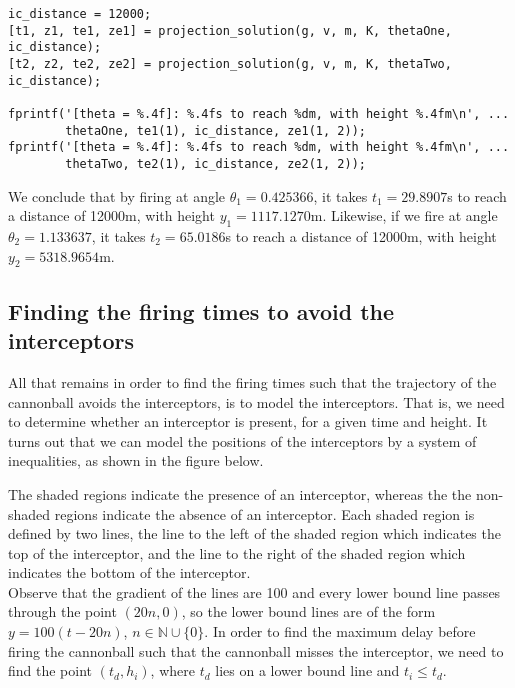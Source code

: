 \begin{lstlisting}
ic_distance = 12000;
[t1, z1, te1, ze1] = projection_solution(g, v, m, K, thetaOne, ic_distance);
[t2, z2, te2, ze2] = projection_solution(g, v, m, K, thetaTwo, ic_distance);

fprintf('[theta = %.4f]: %.4fs to reach %dm, with height %.4fm\n', ...
        thetaOne, te1(1), ic_distance, ze1(1, 2));
fprintf('[theta = %.4f]: %.4fs to reach %dm, with height %.4fm\n', ...
        thetaTwo, te2(1), ic_distance, ze2(1, 2));
\end{lstlisting}

\noindent
We conclude that by firing at angle $\theta_1 = 0.425366$, it takes $t_1 = 29.8907$s to reach a distance of 12000m, with height $y_1 = 1117.1270$m. Likewise, if we fire at angle $\theta_2 = 1.133637$, it takes $t_2 = 65.0186$s to reach a distance of 12000m, with height $y_2 = 5318.9654$m.

\subsection{Finding the firing times to avoid the interceptors}
All that remains in order to find the firing times such that the trajectory of the cannonball avoids the interceptors, is to model the interceptors. That is, we need to determine whether an interceptor is present, for a given time and height. It turns out that we can model the positions of the interceptors by a system of inequalities, as shown in the figure below.



\noindent
The shaded regions indicate the presence of an interceptor, whereas the the non-shaded regions indicate the absence of an interceptor. Each shaded region is defined by two lines, the line to the left of the shaded region which indicates the top of the interceptor, and the line to the right of the shaded region which indicates the bottom of the interceptor.\\

\noindent
Observe that the gradient of the lines are 100 and every lower bound line passes through the point $(20n, 0)$, so the lower bound lines are of the form $y = 100(t - 20n)$, $n \in \mathbb{N} \cup \{0\}$. In order to find the maximum delay before firing the cannonball such that the cannonball misses the interceptor, we need to find the point $(t_d, h_i)$, where $t_d$ lies on a lower bound line and $t_i \leq t_d$.



